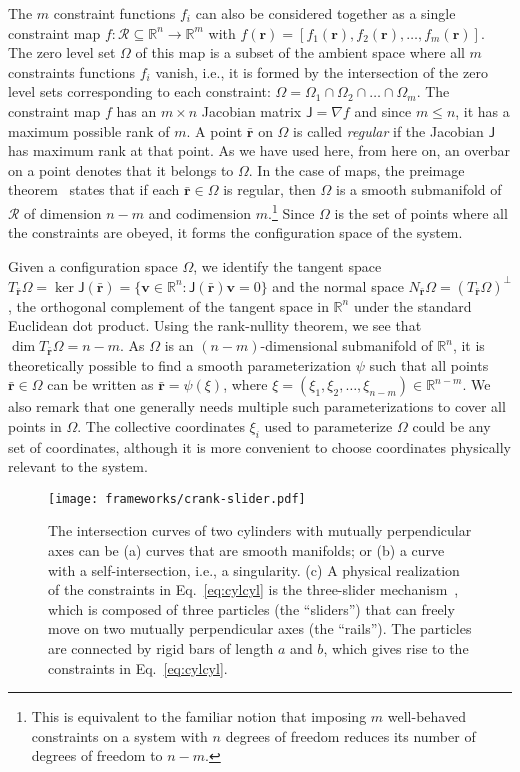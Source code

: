 The $m$ constraint functions $f_i$ can also be considered together as a single constraint map $f: \mathscr{R} \subseteq \mathbb{R}^n \to \mathbb{R}^m$ with $f(\bm{r}) = [f_1(\bm{r}), f_2(\bm{r}), \dots, f_m(\bm{r})]$.
The zero level set $\Omega$ of this map is a subset of the ambient space where all $m$ constraints functions $f_i$ vanish, i.e., it is formed by the intersection of the zero level sets corresponding to each constraint: $\Omega = \Omega_1 \cap \Omega_2 \cap \dots \cap \Omega_m$.
The constraint map $f$ has an $m\times n$ Jacobian matrix $\mathsf{J} = \nabla f$ and since $m\leq n$, it has a maximum possible rank of $m$.
A point $\bar{\bm{r}}$ on $\Omega$ is called \emph{regular} if the Jacobian $\mathsf{J}$ has maximum rank at that point.
As we have used here, from here on, an overbar on a point denotes that it belongs to $\Omega$.
In the case of maps, the preimage theorem~\cite{lee2013} states that if each $\bar{\bm{r}} \in \Omega$ is regular, then $\Omega$ is a smooth submanifold of $\mathscr{R}$ of dimension $n - m$ and codimension $m$.\footnote{This is equivalent to the familiar notion that imposing $m$ well-behaved constraints on a system with $n$ degrees of freedom reduces its number of degrees of freedom to $n-m$.}
Since $\Omega$ is the set of points where all the constraints are obeyed, it forms the configuration space of the system.

Given a configuration space $\Omega$, we identify the tangent space $T_{\bar{\bm{r}}}\Omega = \ker{\mathsf{J}(\bar{\bm{r}})} = \{\bm{v} \in \mathbb{R}^n: \mathsf{J}(\bar{\bm{r}})\bm{v} = 0\}$ and the normal space $N_{\bar{\bm{r}}}\Omega = (T_{\bar{\bm{r}}}\Omega)^\perp$, the orthogonal complement of the tangent space in $\mathbb{R}^n$ under the standard Euclidean dot product.
Using the rank-nullity theorem, we see that $\dim T_{\bar{\bm{r}}}\Omega = n-m$.
As $\Omega$ is an $(n-m)$-dimensional submanifold of $\mathbb{R}^n$, it is theoretically possible to find a smooth parameterization $\psi$ such that all points $\bar{\bm{r}} \in \Omega$ can be written as $\bar{\bm{r}} = \psi(\xi)$, where $\xi = (\xi_1, \xi_2, \ldots, \xi_{n-m}) \in \mathbb{R}^{n-m}$.
We also remark that one generally needs multiple such parameterizations to cover all points in $\Omega$.
The collective coordinates $\xi_i$ used to parameterize $\Omega$ could be any set of coordinates, although it is more convenient to choose coordinates physically relevant to the system.
%
\begin{figure}
  \begin{center}
    \texttt{[image: frameworks/crank-slider.pdf]}
  \end{center}
  \caption{The intersection curves of two cylinders with mutually perpendicular axes can be (a) curves that are smooth manifolds; or (b) a curve with a self-intersection, i.e., a singularity. (c) A physical realization of the constraints in Eq.~\eqref{eq:cylcyl} is the three-slider mechanism~\cite{bohigas2019}, which is composed of three particles (the ``sliders'') that can freely move on two mutually perpendicular axes (the ``rails'').
    The particles are connected by rigid bars of length $a$ and $b$, which gives rise to the constraints in Eq.~\eqref{eq:cylcyl}.
  }
  \label{fig:slider}
\end{figure}

